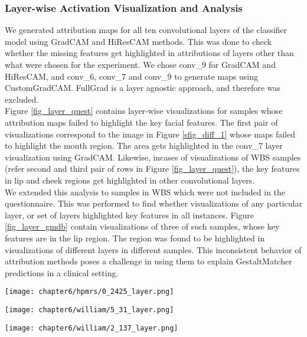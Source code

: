 \documentclass[../report.tex]{subfiles}
\begin{document}
    \subsubsection{Layer-wise Activation Visualization and Analysis}
    We generated attribution maps for all ten convolutional layers of the classifier model using GradCAM and HiResCAM methods. This was done to check whether the missing features get highlighted in attributions of layers other than what were chosen for the experiment. We chose conv\_9 for GradCAM and HiResCAM, and conv\_6, conv\_7 and conv\_9 to generate maps using CustomGradCAM. FullGrad is a layer agnostic approach, and therefore was excluded.\\
	Figure \ref{fig_layer_quest} contains layer-wise visualizations for samples whose attribution maps failed to highlight the key facial features. The first pair of visualizations correspond to the image in Figure \ref{sfig_diff_1} whose maps failed to highlight the mouth region. The area gets highlighted in the conv\_7 layer visualization using GradCAM. Likewise, incases of visualizations of WBS samples (refer second and third pair of rows in Figure \ref{fig_layer_quest}), the key features in lip and cheek regions get highlighted in other convolutional layers.\\
	We extended this analysis to samples in WBS which were not included in the questionnaire. This was performed to find whether visualizations of any particular layer, or set of layers highlighted  key features in all instances. Figure \ref{fig_layer_gmdb} contain visualizations of three of such samples, whose key features are in the lip region. The region was found to be highlighted in visualizations of different layers in different samples. This inconsistent behavior of attribution methods poses a challenge in using them to explain GestaltMatcher predictions in a clinical setting.  
    \begin{sidewaysfigure}
    	\texttt{[image: chapter6/hpmrs/0\_2425\_layer.png]}
    	
    	\texttt{[image: chapter6/william/5\_31\_layer.png]}
	      
    	\texttt{[image: chapter6/william/2\_137\_layer.png]}
    	\caption[Example layer-wise activation map visualizations for instances presented in the questionnaire]{Example layer-wise activation map visualizations for instances presented in the questionnaire. Layers highlighting syndromic features are boxed in red.}
	   \label{fig_layer_quest}	
    \end{sidewaysfigure}
\end{document}
